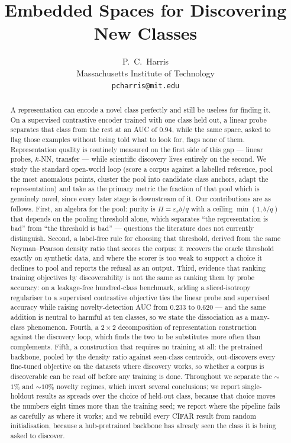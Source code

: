 \documentclass{article}
\title{Embedded Spaces for Discovering New Classes}
\author{P.~C.~Harris\\ Massachusetts Institute of Technology \\ \texttt{pcharris@mit.edu}}
\date{}
\begin{document}
\maketitle

\begin{abstract}
A representation can encode a novel class perfectly and still be useless for
finding it. On a supervised contrastive encoder trained with one class held
out, a linear probe separates that class from the rest at an AUC of $0.94$,
while the same space, asked to flag those examples without being told what to
look for, flags none of them. Representation quality is routinely measured on
the first side of this gap --- linear probes, $k$-NN, transfer --- while
scientific discovery lives entirely on the second. We study the standard
open-world loop (score a corpus against a labelled reference, pool the most
anomalous points, cluster the pool into candidate class anchors, adapt the
representation) and take as the primary metric the fraction of that pool which
is genuinely novel, since every later stage is downstream of it. Our
contributions are as follows. First, an algebra for the pool: purity is
$\Pi = \varepsilon_s b / q$ with a ceiling $\min(1, b/q)$ that depends on the
pooling threshold alone, which separates ``the representation is bad'' from
``the threshold is bad'' --- questions the literature does not currently
distinguish. Second, a label-free rule for choosing that threshold, derived
from the same Neyman--Pearson density ratio that scores the corpus; it recovers
the oracle threshold exactly on synthetic data, and where the scorer is too
weak to support a choice it declines to pool and reports the refusal as an
output. Third, evidence that ranking training objectives by discoverability is
not the same as ranking them by probe accuracy: on a leakage-free
hundred-class benchmark, adding a sliced-isotropy regulariser to a supervised
contrastive objective ties the linear probe and supervised accuracy while
raising novelty-detection AUC from $0.233$ to $0.620$ --- and the same
addition is neutral to harmful at ten classes, so we state the dissociation
as a many-class phenomenon. Fourth, a $2\times2$ decomposition of
representation construction against the discovery loop, which finds the two
to be substitutes more often than complements. Fifth, a construction that
requires no training at all: the pretrained backbone, pooled by the density
ratio against seen-class centroids, out-discovers every fine-tuned objective
on the datasets where discovery works, so whether a corpus is discoverable
can be read off before any training is done. Throughout we separate the
$\sim$$1\%$ and $\sim$$10\%$ novelty regimes, which invert several
conclusions; we report single-holdout results as spreads over the choice of
held-out class, because that choice moves the numbers eight times more than
the training seed; we report where the pipeline fails as carefully as where
it works; and we rebuild every CIFAR result from random initialisation,
because a hub-pretrained backbone has already seen the class it is being
asked to discover.
\end{abstract}
\end{document}
